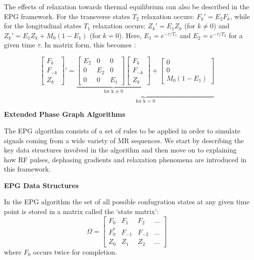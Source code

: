 The effects of relaxation towards thermal equilibrium can also be described in the EPG framework.
For the transverse states $T_2$ relaxation occurs: $F_k' = E_2 F_k$, while for the longitudinal states $T_1$ relaxation occurs: $Z_k' = E_1 Z_k$ (for $k \neq 0$)
and $Z_k' = E_1 Z_k + M_0(1 - E_1)$ (for $k = 0$).
Here, $E_1 = e^{-\tau/T_1}$ and $E_2 = e^{-\tau/T_2}$ for a given time $\tau$.
In matrix form, this becomes \cite{Hennig1991}:

\begin{equation}\label{eq:woessnerFn}
    \begin{bmatrix}
        F_k      \\
        F_{-k} \\
        Z_k
    \end{bmatrix}' = 
    \underbrace{
    \underbrace{\begin{bmatrix}
        E_2 & 0 & 0 \\
        0 & E_2 & 0 \\
        0 & 0 & E_1 
    \end{bmatrix}
    \begin{bmatrix}
        F_k      \\
        F_{-k} \\
        Z_k
    \end{bmatrix}}_\text{for k $\neq$ 0}
    +
    \begin{bmatrix}
        0 \\
        0 \\
        M_0 (1 - E_1)
    \end{bmatrix}}_\text{for k = 0}
\end{equation}

\hfill

\large \textbf{Extended Phase Graph Algorithms} \normalsize

The EPG algorithm consists of a set of rules to be applied in order to simulate signals coming from a wide variety of MR sequences.
We start by describing the key data structures involved in the algorithm and then move on to explaining how RF pulses, dephasing gradients and relaxation phenomena are introduced in this framework.

\hfill

\textbf{EPG Data Structures}

In the EPG algorithm the set of all possible confugration states at any given time point is stored in a matrix called the `state matrix':
\begin{equation}
    \Omega = 
    \begin{bmatrix}
    F_0 & F_1 & F_2 & \dots \\
    F_0^* & F_{-1} & F_{-2} & \dots \\
    Z_0 & Z_1 & Z_2 & \dots 
    \end{bmatrix}
\end{equation}
where $F_0$ occurs twice for completion.

